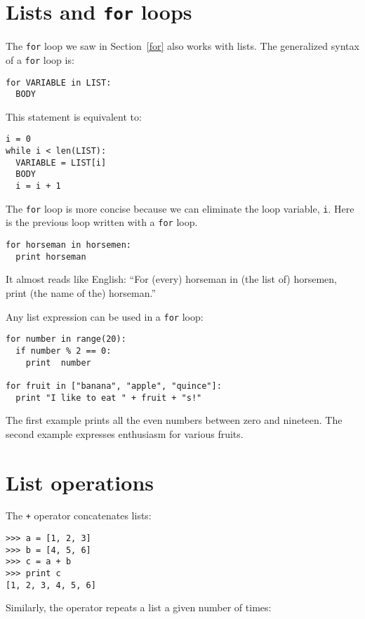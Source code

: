 \section{Lists and {\tt for} loops}

The {\tt for} loop we saw in Section~\ref{for} also works with
lists.
The generalized syntax of a {\tt for} loop is:

\beforeverb
\begin{verbatim}
for VARIABLE in LIST:
  BODY
\end{verbatim}
\afterverb
%
This statement is equivalent to:

\beforeverb
\begin{verbatim}
i = 0
while i < len(LIST):
  VARIABLE = LIST[i]
  BODY
  i = i + 1
\end{verbatim}
\afterverb
%
The {\tt for} loop is more concise because we can 
eliminate the loop variable, {\tt i}.
Here is the previous loop written with a {\tt for} loop.

\beforeverb
\begin{verbatim}
for horseman in horsemen:
  print horseman
\end{verbatim}
\afterverb
%
It almost reads like English: ``For (every) horseman
in (the list of) horsemen, print (the name of the) horseman.''

Any list expression can be used in a {\tt for} loop:

\beforeverb
\begin{verbatim}
for number in range(20):
  if number % 2 == 0:
    print  number

for fruit in ["banana", "apple", "quince"]:
  print "I like to eat " + fruit + "s!"
\end{verbatim}
\afterverb
%
The first
example prints all the even numbers between zero and nineteen.
The second example expresses enthusiasm for various fruits.



\section{List operations}

The {\tt +} operator concatenates lists:


\beforeverb
\begin{verbatim}
>>> a = [1, 2, 3]
>>> b = [4, 5, 6]
>>> c = a + b
>>> print c
[1, 2, 3, 4, 5, 6]
\end{verbatim}
\afterverb
%
Similarly, the {\tt *} operator repeats a list a given number of times:

